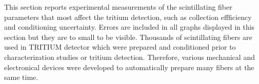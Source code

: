 This section reports experimental measurements of the scintillating fiber parameters that most affect the tritium detection, such as collection effficiency and conditioning uncertainty. Errors are included in all graphs displayed in this section but they are to small to be visible. Thousands of scintillating fibers are used in TRITIUM detector which were prepared and conditioned prior to characterization studies or tritium detection. Therefore, various mechanical and electronical devices were developed to automatically prepare many fibers at the same time.